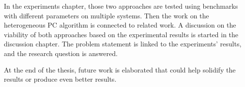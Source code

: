 In the experiments chapter, those two approaches are tested using benchmarks with different parameters on multiple systems. Then the work on the heterogeneous PC algorithm is connected to related work. A discussion on the viability of both approaches based on the experimental results is started in the discussion chapter. The problem statement is linked to the experiments' results, and the research question is answered.

At the end of the thesis, future work is elaborated that could help solidify the results or produce even better results.

% 



